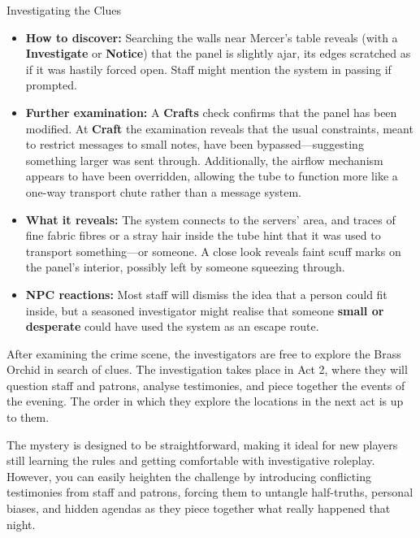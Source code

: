 \begin{CommentBox}{Investigating the Clues}
	\begin{itemize}
		\item \textbf{How to discover:} Searching the walls near Mercer's table reveals (with a \Difficult \textbf{Investigate} or \textbf{Notice}) that the panel is slightly ajar, its edges scratched as if it was hastily forced open. Staff might mention the system in passing if prompted.
		\item \textbf{Further examination:} A \Challenging \textbf{Crafts} check confirms that the panel has been modified. At \Difficult \textbf{Craft} the examination reveals that the usual constraints, meant to restrict messages to small notes, have been bypassed—suggesting something larger was sent through. Additionally, the airflow mechanism appears to have been overridden, allowing the tube to function more like a one-way transport chute rather than a message system.
		\item \textbf{What it reveals:} The system connects to the servers' area, and traces of fine fabric fibres or a stray hair inside the tube hint that it was used to transport something—or someone. A close look reveals faint scuff marks on the panel's interior, possibly left by someone squeezing through.
		\item \textbf{NPC reactions:} Most staff will dismiss the idea that a person could fit inside, but a seasoned investigator might realise that someone \textbf{small or desperate} could have used the system as an escape route.
	\end{itemize}
\end{CommentBox}

After examining the crime scene, the investigators are free to explore the Brass Orchid in search of clues. The investigation takes place in Act 2, where they will question staff and patrons, analyse testimonies, and piece together the events of the evening. The order in which they explore the locations in the next act is up to them.

\begin{GmTips}
	The mystery is designed to be straightforward, making it ideal for new players still learning the rules and getting comfortable with investigative roleplay. However, you can easily heighten the challenge by introducing conflicting testimonies from staff and patrons, forcing them to untangle half-truths, personal biases, and hidden agendas as they piece together what really happened that night.
\end{GmTips}
